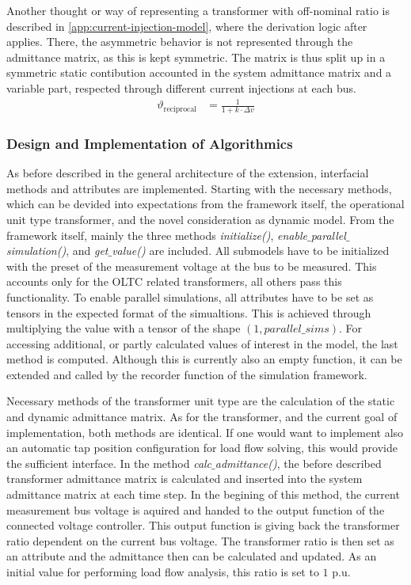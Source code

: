 Another thought or way of representing a transformer with off-nominal ratio is described in \autoref{app:current-injection-model}, where the derivation logic after \textcite{machowski_2020} applies.
There, the asymmetric behavior is not represented through the admittance matrix, as this is kept symmetric. 
The matrix is thus split up in a symmetric static contibution accounted in the system admittance matrix and a variable part, respected through different current injections at each bus. 
\begin{align}
        \vartheta_\mathrm{reciprocal} &= \frac{1}{1 + k \cdot \Delta v} \label{eq:tap-ratio-lv}
\end{align}

\subsubsection{Design and Implementation of Algorithmics}

As before described in the general architecture of the extension, interfacial methods and attributes are implemented.
Starting with the necessary methods, which can be devided into expectations from the framework itself, the operational unit type transformer, and the novel consideration as dynamic model.
From the framework itself, mainly the three methods \textit{initialize()}, \textit{enable$\_$parallel$\_$simulation()}, and \textit{get$\_$value()} are included.
All submodels have to be initialized with the preset of the measurement voltage at the bus to be measured. 
This accounts only for the \acs{OLTC} related transformers, all others pass this functionality.
To enable parallel simulations, all attributes have to be set as tensors in the expected format of the simualtions.
This is achieved through multiplying the value with a tensor of the shape $(1, {parallel\_sims})$.
For accessing additional, or partly calculated values of interest in the model, the last method is computed.
Although this is currently also an empty function, it can be extended and called by the recorder function of the simulation framework.

Necessary methods of the transformer unit type are the calculation of the static and dynamic admittance matrix.
As for the transformer, and the current goal of implementation, both methods are identical.
If one would want to implement also an automatic tap position configuration for load flow solving, this would provide the sufficient interface.
In the method \textit{calc$\_$admittance()}, the before described transformer admittance matrix is calculated and inserted into the system admittance matrix at each time step.
In the begining of this method, the current measurement bus voltage is aquired and handed to the output function of the connected voltage controller.
This output function is giving back the transformer ratio dependent on the current bus voltage. 
The transformer ratio is then set as an attribute and the admittance then can be calculated and updated.
As an initial value for performing load flow analysis, this ratio is set to $1$ p.u.

